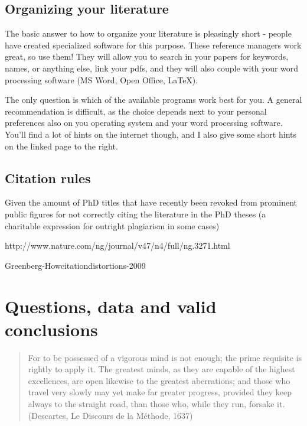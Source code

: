 \documentclass{tufte-book}
\begin{document}
\section{Organizing your literature}

The basic answer to how to organize your literature is pleasingly short - people have created specialized software for this purpose. These reference managers work great, so use them! They will allow you to search in your papers for keywords, names, or anything else, link your pdfs, and they will also couple with your word processing software (MS Word, Open Office, LaTeX). 


The only question is which of the available programs work best for you. A general recommendation is difficult, as the choice depends next to your personal preferences also on you operating system and your word processing software. You'll find a lot of hints on the internet though, and I also give some short hints on the linked page to the right. 

\section{Citation rules}


Given the amount of PhD titles that have recently been revoked from prominent public figures for not correctly citing the literature in the PhD theses (a charitable expression for outright plagiarism in some cases)

http://www.nature.com/ng/journal/v47/n4/full/ng.3271.html

Greenberg-Howcitationdistortions-2009






\chapter{Questions, data and valid conclusions}

\begin{quote}
For to be possessed of a vigorous mind is not enough; the prime requisite is rightly to apply it. The greatest minds, as they are capable of the highest excellences, are open likewise to the greatest aberrations; and those who travel very slowly may yet make far greater progress, provided they keep always to the straight road, than those who, while they run, forsake it. (Descartes, Le Discours de la Méthode, 1637) 
\end{quote}
\end{document}
